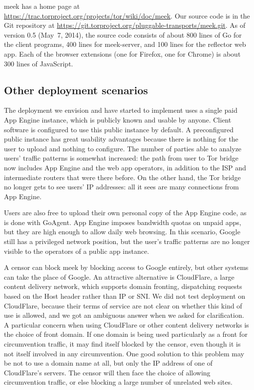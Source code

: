 \documentclass[conference]{IEEEtran}
\def\meekserver{\mbox{meek-server}}
\begin{document}
meek has a home page at
\url{https://trac.torproject.org/projects/tor/wiki/doc/meek}.
Our source code is in the Git repository at
\url{https://git.torproject.org/pluggable-transports/meek.git}.
As of version 0.5 (May~7, 2014), the source code consists of
about 800 lines of Go for the client programs,
400 lines for \meekserver, and
100 lines for the reflector web app.
Each of the browser extensions
(one for Firefox, one for Chrome)
is about 300 lines of JavaScript.


\subsection{Other deployment scenarios}
\label{sec:otherdeployment}

The deployment we envision and have started to implement
uses a single paid App Engine instance, which is publicly known and usable by anyone.
Client software is configured to use this public instance by default.
A preconfigured public instance has great usability advantages
because there is nothing for the user to upload and nothing to configure.
The number of parties able to analyze users' traffic patterns is somewhat increased:
the path from user to Tor bridge now includes App Engine and the web app operators,
in addition to the ISP and intermediate routers that were there before.
On the other hand, the Tor bridge no longer gets to see users' IP addresses:
all it sees are many connections from App Engine.

Users are also free to upload their own personal copy of the App Engine code, as is done with GoAgent.
App Engine imposes bandwidth quotas on unpaid apps, but they are high enough to allow daily web browsing.
In this scenario, Google still has a privileged network position,
but the user's traffic patterns are no longer visible to the operators of a public app instance.

A censor can block meek by blocking access to Google entirely,
but other systems can take the place of Google.
An attractive alternative is CloudFlare, a large content delivery network,
which supports domain fronting, dispatching requests based on the Host header
rather than IP or SNI.
We did not test deployment on CloudFlare,
because their terms of service are not clear on whether this kind of use is allowed,
and we got an ambiguous answer when we asked for clarification.
A particular concern when using CloudFlare or other content delivery networks is the choice of front domain.
If one domain is being used particularly as a front for circumvention traffic,
it may find itself blocked by the censor, even though it is not itself
involved in any circumvention.
One good solution to this problem may be not to use a domain name at all,
but only the IP address of one of CloudFlare's servers.
The censor will then face the choice of allowing circumvention traffic,
or else blocking a large number of unrelated web sites.
\end{document}
